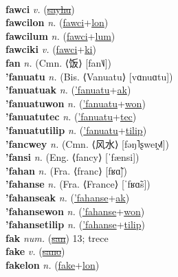  \label{fepucocalulum} \\
\textbf{fawci} \textit{v.} (\hyperref[sayhu]{\sout{sayhu}})
 \label{fawci} \\
\textbf{fawcilon} \textit{n.} (\hyperref[fawci]{fawci}+\hyperref[lon]{lon})
 \label{fawcilon} \\
\textbf{fawcilum} \textit{n.} (\hyperref[fawci]{fawci}+\hyperref[lum]{lum})
 \label{fawcilum} \\
\textbf{fawciki} \textit{v.} (\hyperref[fawci]{fawci}+\hyperref[ki]{ki})
 \label{fawciki} \\
\textbf{fan} \textit{n.} (Cmn. ⟨饭⟩ [fan˥˩])
 \label{fan} \\
\textbf{'fanuatu} \textit{n.} (Bis. ⟨Vanuatu⟩ [vɑnuɑtu])
 \label{'fanuatu} \\
\textbf{'fanuatuak} \textit{n.} (\hyperref['fanuatu]{'fanuatu}+\hyperref[ak]{ak})
 \label{'fanuatuak} \\
\textbf{'fanuatuwon} \textit{n.} (\hyperref['fanuatu]{'fanuatu}+\hyperref[won]{won})
 \label{'fanuatuwon} \\
\textbf{'fanuatutec} \textit{n.} (\hyperref['fanuatu]{'fanuatu}+\hyperref[tec]{tec})
 \label{'fanuatutec} \\
\textbf{'fanuatutilip} \textit{n.} (\hyperref['fanuatu]{'fanuatu}+\hyperref[tilip]{tilip})
 \label{'fanuatutilip} \\
\textbf{'fancwey} \textit{n.} (Cmn. ⟨风水⟩ [fəŋ˥ʂweɪ̯˧˩˥])
 \label{'fancwey} \\
\textbf{'fansi} \textit{n.} (Eng. ⟨fancy⟩ [ˈfænsi])
 \label{'fansi} \\
\textbf{'fahan} \textit{n.} (Fra. ⟨franc⟩ [fʁɑ̃])
 \label{'fahan} \\
\textbf{'fahanse} \textit{n.} (Fra. ⟨France⟩ [ˈfʁɑ̃s])
 \label{'fahanse} \\
\textbf{'fahanseak} \textit{n.} (\hyperref['fahanse]{'fahanse}+\hyperref[ak]{ak})
 \label{'fahanseak} \\
\textbf{'fahansewon} \textit{n.} (\hyperref['fahanse]{'fahanse}+\hyperref[won]{won})
 \label{'fahansewon} \\
\textbf{'fahansetilip} \textit{n.} (\hyperref['fahanse]{'fahanse}+\hyperref[tilip]{tilip})
 \label{'fahansetilip} \\
\textbf{fak} \textit{num.} (\hyperref[san]{\sout{san}})
13; trece \label{fak} \\
\textbf{fake} \textit{v.} (\hyperref[sano]{\sout{sano}})
 \label{fake} \\
\textbf{fakelon} \textit{n.} (\hyperref[fake]{fake}+\hyperref[lon]{lon})
